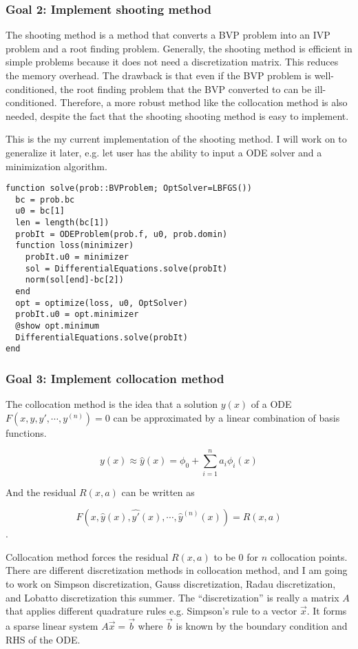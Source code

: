 \documentclass[a4paper,12pt,onecolumn]{article}
\begin{document}
\subsubsection{Goal 2: Implement shooting method}
The shooting method is a method that converts a BVP problem into an IVP problem and a root finding
problem. Generally, the shooting method is efficient in simple problems because it does not need
a discretization matrix. This reduces the memory overhead. The drawback is that even if the BVP problem
is well-conditioned, the root finding problem that the BVP converted to can be ill-conditioned.
Therefore, a more robust method like the collocation method is also needed, despite the fact that
the shooting shooting method is easy to implement.

This is the my current implementation of the shooting method. I will work on to generalize it later,
e.g. let user has the ability to input a ODE solver and a minimization algorithm.

\begin{lstlisting}[mathescape=true]
function solve(prob::BVProblem; OptSolver=LBFGS())
  bc = prob.bc
  u0 = bc[1]
  len = length(bc[1])
  probIt = ODEProblem(prob.f, u0, prob.domin)
  function loss(minimizer)
    probIt.u0 = minimizer
    sol = DifferentialEquations.solve(probIt)
    norm(sol[end]-bc[2])
  end
  opt = optimize(loss, u0, OptSolver)
  probIt.u0 = opt.minimizer
  @show opt.minimum
  DifferentialEquations.solve(probIt)
end
\end{lstlisting}

\subsubsection{Goal 3: Implement collocation method}
The collocation method is the idea that a solution $y(x)$ of a ODE $F(x, y, y', \cdots, y^{(n)}) = 0$
can be approximated by a linear combination of basis functions.

\[y(x) \approx \hat{y}(x) = \phi_0 + \sum_{i=1}^na_i\phi_i(x)\]

And the residual $R(x,a)$ can be written as

\[F(x, \hat{y}(x), \hat{y'}(x), \cdots, \hat{y}^{(n)}(x)) = R(x,a)\].

Collocation method forces the residual $R(x,a)$ to be $0$ for $n$ collocation points.
There are different discretization methods in collocation method, and I am going to work on
Simpson discretization, Gauss discretization, Radau discretization, and Lobatto
discretization this summer. The ``discretization'' is really a matrix $A$ that applies different
quadrature rules e.g. Simpson's rule to a vector $\vec{x}$. It forms a sparse linear system
$A\vec{x}=\vec{b}$ where $\vec{b}$ is known by the boundary condition and RHS of the ODE.
\end{document}

